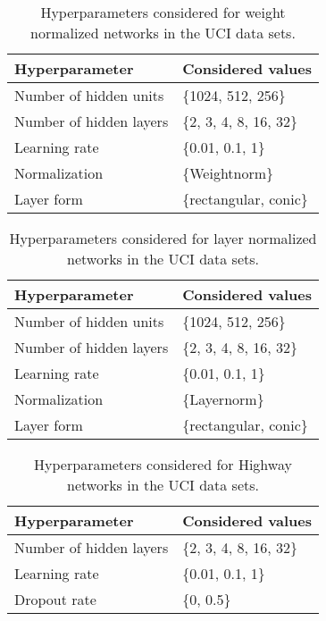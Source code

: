 \documentclass{article}
\begin{document}
\begin{table}[htp]
\begin{center}
\caption{Hyperparameters considered for weight normalized networks in the UCI data sets.}

\begin{tabular}{ll}
\toprule
Hyperparameter  & Considered values \\ 
\midrule
  Number of hidden units & \{1024, 512, 256\} \\
  Number of hidden layers & \{2, 3, 4, 8, 16, 32\} \\
  Learning rate & \{0.01, 0.1, 1\} \\
  Normalization & \{Weightnorm\} \\
  Layer form & \{rectangular, conic\} \\
\bottomrule
\end{tabular}
\end{center}

\end{table}



\begin{table}[htp]
\begin{center}
\caption{Hyperparameters considered for layer normalized networks in the UCI data sets.}

\begin{tabular}{ll}
\toprule
Hyperparameter  & Considered values \\ 
\midrule
  Number of hidden units & \{1024, 512, 256\} \\
  Number of hidden layers & \{2, 3, 4, 8, 16, 32\} \\
  Learning rate & \{0.01, 0.1, 1\} \\
  Normalization & \{Layernorm\} \\
  Layer form & \{rectangular, conic\} \\

\bottomrule
\end{tabular}
\end{center}

\end{table}



\begin{table}[htp]
\begin{center}
\caption{Hyperparameters considered for Highway networks in the UCI data sets.}

\begin{tabular}{ll}
\toprule
Hyperparameter  & Considered values \\ 
\midrule
  Number of hidden layers & \{2, 3, 4, 8, 16, 32\} \\
  Learning rate & \{0.01, 0.1, 1\} \\
  Dropout rate & \{0, 0.5\} \\
\bottomrule
\end{tabular}
\end{center}

\end{table}
\end{document}
